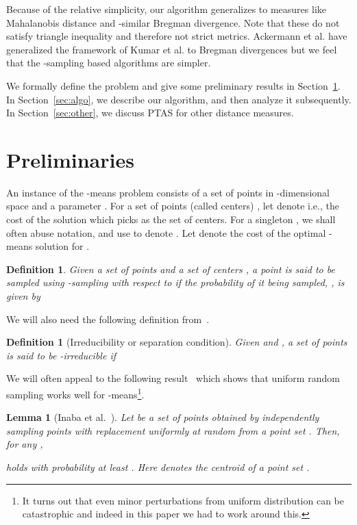 \documentclass[a4paper]{article}
\newtheorem{lemma}[theorem]{Lemma}
\newtheorem{definition}[theorem]{Definition}
\begin{document}
Because of the relative simplicity, our algorithm generalizes to measures
like Mahalanobis distance and -similar Bregman divergence. Note that
these do not satisfy triangle inequality and therefore not strict metrics.
Ackermann et al. \cite{ab09} have generalized the framework of Kumar et al.
\cite{KumarSS10} to Bregman divergences but we feel that the -sampling based
algorithms are simpler.

We formally define the problem and give some preliminary results in Section~\ref{sec:pre}.
In Section~\ref{sec:algo}, we describe our algorithm, and then analyze it subsequently. In Section~\ref{sec:other}, we discuss PTAS for other distance measures. 





\section{Preliminaries}
\label{sec:pre}
An instance of the -means problem consists of a set  of  points in -dimensional space and a parameter .
For a set of points (called centers) , let  denote  i.e., the cost of the
solution which picks  as the set of centers. For a singleton , we shall often abuse notation,
and use  to denote .
 Let  denote the cost of the optimal -means
solution for .

\begin{definition}
Given a set of points  and a set of centers , a point  is said to be sampled using {\em -sampling}
with respect to  if the probability of it being sampled, ,  is given by

\end{definition}

We will also need the following definition from~\cite{KumarSS10}.
\begin{definition}[Irreducibility or separation condition] Given  and , a set of points  is said to be -irreducible if

\end{definition}


We will often appeal to the following result~\cite{inaba} which shows that uniform random sampling works well for -means\footnote{It turns out
that even minor perturbations from uniform distribution can be catastrophic and indeed in this paper we had to work around this.}.
\begin{lemma}[Inaba et al.~\cite{inaba}]
\label{lem:inaba}
Let  be a set of points obtained by independently sampling  points with replacement uniformly at random from a point set . Then, for any ,

holds with probability at least . 
Here  denotes the centroid of a point set .
\end{lemma}
\end{document}
